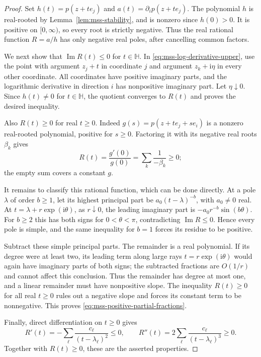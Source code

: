 \documentclass[11pt]{amsart}
\theoremstyle{definition}
\theoremstyle{remark}
\numberwithin{equation}{section}
\begin{document}
\begin{proof}
Set $h(t)=p(z+te_j)$ and $a(t)=\partial_i p(z+te_j)$.
The polynomial $h$ is real-rooted by
Lemma~\ref{lem:mss-stability}, and is nonzero since $h(0)>0$.
It is positive on $[0,\infty)$, so every root is strictly negative.
Thus the real rational function $R=a/h$ has only negative real
poles, after cancelling common factors.

We next show that $\operatorname{Im}R(t)\leq0$ for $t\in\mathbb H$.
In \eqref{eq:mss-log-derivative-upper}, use the point with argument
$z_j+t$ in coordinate $j$ and argument $z_k+\mathrm i\eta$ in every
other coordinate.  All coordinates have positive imaginary parts,
and the logarithmic derivative in direction $i$ has nonpositive
imaginary part.  Let $\eta\downarrow0$.
Since $h(t)\ne0$ for $t\in\mathbb H$, the quotient converges to
$R(t)$ and proves the desired inequality.

Also $R(t)\geq0$ for real $t\geq0$.  Indeed
$g(s)=p(z+te_j+se_i)$ is a nonzero real-rooted polynomial, positive
for $s\geq0$.  Factoring it with its negative real roots $\beta_k$
gives
\[
 R(t)=\frac{g'(0)}{g(0)}=\sum_k\frac1{-\beta_k}\geq0;
\]
the empty sum covers a constant $g$.

It remains to classify this rational function, which can be done
directly.  At a pole $\lambda$ of order $b\geq1$, let its highest
principal part be $a_0(t-\lambda)^{-b}$, with $a_0\ne0$ real.
At $t=\lambda+r\exp(\mathrm i\theta)$, as $r\downarrow0$, the
leading imaginary part is
$-a_0r^{-b}\sin(b\theta)$.
For $b\geq2$ this has both signs for $0<\theta<\pi$, contradicting
$\operatorname{Im}R\leq0$.  Hence every pole is simple, and the same
inequality for $b=1$ forces its residue to be positive.

Subtract these simple principal parts.  The remainder is a real
polynomial.  If its degree were at least two, its leading term along
large rays $t=r\exp(\mathrm i\theta)$ would again have imaginary
parts of both signs; the subtracted fractions are $O(1/r)$ and
cannot affect this conclusion.  Thus the remainder has degree at
most one, and a linear remainder must have nonpositive slope.
The inequality $R(t)\geq0$ for all real $t\geq0$ rules out a
negative slope and forces its constant term to be nonnegative.
This proves \eqref{eq:mss-positive-partial-fractions}.

Finally, direct differentiation on $t\geq0$ gives
\[
 R'(t)=-\sum_\ell\frac{c_\ell}{(t-\lambda_\ell)^2}\leq0,
 \qquad
 R''(t)=2\sum_\ell\frac{c_\ell}{(t-\lambda_\ell)^3}\geq0.
\]
Together with $R(t)\geq0$, these are the asserted properties.
\end{proof}
\end{document}
